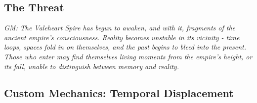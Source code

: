\documentclass[11pt]{article}
\newcommand{\gm}[1]{\textit{GM: #1}}
\begin{document}
\subsection*{The Threat}

\gm{The Valeheart Spire has begun to awaken, and with it, fragments of the ancient empire's consciousness. Reality becomes unstable in its vicinity - time loops, spaces fold in on themselves, and the past begins to bleed into the present. Those who enter may find themselves living moments from the empire's height, or its fall, unable to distinguish between memory and reality.}

\subsection*{Custom Mechanics: Temporal Displacement}
\end{document}
